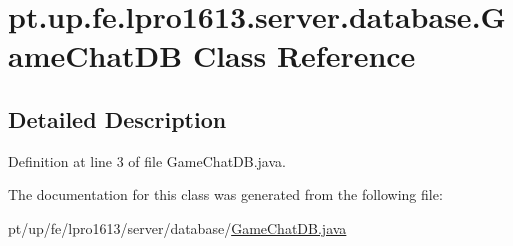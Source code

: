 \hypertarget{classpt_1_1up_1_1fe_1_1lpro1613_1_1server_1_1database_1_1_game_chat_d_b}{}\section{pt.\+up.\+fe.\+lpro1613.\+server.\+database.\+Game\+Chat\+DB Class Reference}
\label{classpt_1_1up_1_1fe_1_1lpro1613_1_1server_1_1database_1_1_game_chat_d_b}


\subsection{Detailed Description}


Definition at line 3 of file Game\+Chat\+D\+B.\+java.



The documentation for this class was generated from the following file\+:\begin{DoxyCompactItemize}
\item 
pt/up/fe/lpro1613/server/database/\hyperlink{_game_chat_d_b_8java}{Game\+Chat\+D\+B.\+java}\end{DoxyCompactItemize}
